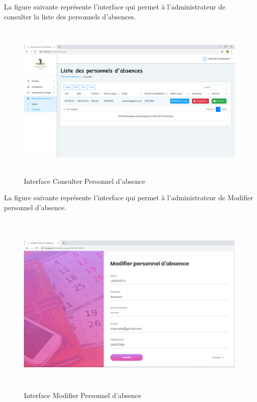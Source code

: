 \documentclass[12 pt]{report}
\begin{document}
La figure suivante représente l'interface qui permet à l'administrateur de consulter la liste des personnels d'absences.
\begin{figure}[h]
 \begin{center}
\includegraphics[width= 18 cm ,height=  7.75cm]{consulter_pa.PNG}
\caption{Interface Consulter Personnel d'absence}

\end{center}
\end{figure}
\newpage
La figure suivante représente l'interface qui permet à l'administrateur de Modifier  personnel d'absence.
\begin{figure}[h]
 \begin{center}
\includegraphics[width= 18 cm ,height=  9cm]{modifier_pa.PNG}
\caption{Interface Modifier Personnel d'absence}

\end{center}
\end{figure}\\
\end{document}
